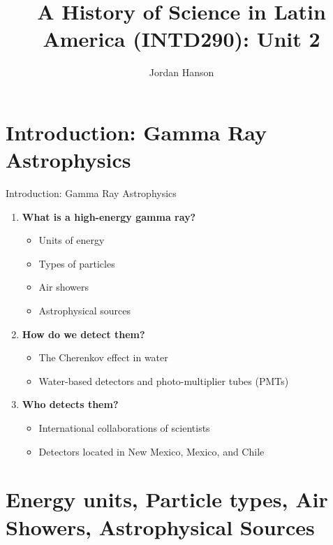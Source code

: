 \documentclass{beamer}
\title{A History of Science in Latin America (INTD290): Unit 2}
\author{Jordan Hanson}
\institute{Whittier College Department of Physics and Astronomy}
\begin{document}
\maketitle

\section{Introduction: Gamma Ray Astrophysics}

\begin{frame}{Introduction: Gamma Ray Astrophysics}
\begin{enumerate}
\item \textbf{What is a high-energy gamma ray?}
\begin{itemize}
\item Units of energy
\item Types of particles
\item Air showers
\item Astrophysical sources
\end{itemize}
\item \textbf{How do we detect them?}
\begin{itemize}
\item The Cherenkov effect in water
\item Water-based detectors and photo-multiplier tubes (PMTs)
\end{itemize}
\item \textbf{Who detects them?}
\begin{itemize}
\item International collaborations of scientists
\item Detectors located in New Mexico, Mexico, and Chile
\end{itemize}
\end{enumerate}
\end{frame}

\section{Energy units, Particle types, Air Showers, Astrophysical Sources}
\end{document}
